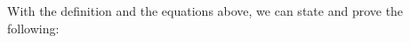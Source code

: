 \documentclass[sn-mathphys-num]{sn-jnl}%
\newcommand{\GG}{\Gamma}
\newcommand{\GD}{\Delta}
\newcommand{\vd}{\vdash}
\newcommand{\lolli}{\multimap}
\newcommand{\lleft}{{\lolli}\mathsf{L}}
\newcommand{\lright}{{\lolli}\mathsf{R}}
\newcommand{\mf}[1]{\mathsf{#1}}
\theoremstyle{thmstyleone}%
\theoremstyle{thmstyletwo}%
\theoremstyle{thmstylethree}%
\begin{document}
With the definition and the equations above, we can state and prove the following:
\cutIntrp
\end{document}
